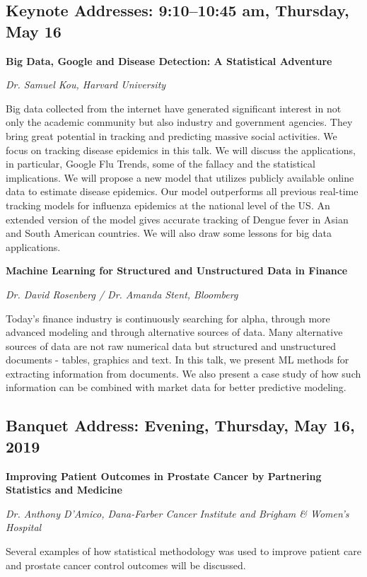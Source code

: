 \documentclass[10pt]{article}
\begin{document}
\subsection*{Keynote Addresses: 9:10--10:45 am, Thursday, May 16}

\noindent
{\bf Big Data, Google and Disease Detection: A Statistical Adventure}

\emph{Dr. Samuel Kou, Harvard University}


Big data collected from the internet have generated significant
interest in not only the academic community but also industry and
government agencies. They bring great potential in tracking and
predicting massive social activities. We focus on tracking disease
epidemics in this talk. We will discuss the applications, in
particular, Google Flu Trends, some of the fallacy and the statistical
implications. We will propose a new model that utilizes publicly
available online data to estimate disease epidemics. Our model
outperforms all previous real-time tracking models for influenza
epidemics at the national level of the US. An extended version of the
model gives accurate tracking of Dengue fever in Asian and South
American countries. We will also draw some lessons for big data
applications.

{\bf Machine Learning for Structured and Unstructured Data in Finance}

\emph{Dr. David Rosenberg / Dr. Amanda Stent, Bloomberg}

Today's finance industry is continuously searching for alpha, through
more advanced modeling and through alternative sources of data. Many
alternative sources of data are not raw numerical data but structured
and unstructured documents - tables, graphics and text. In this talk,
we present ML methods for extracting information from documents. We
also present a case study of how such information can be combined with
market data for better predictive modeling.


\subsection*{Banquet Address:  Evening, Thursday, May 16, 2019}

\noindent
{\bf Improving Patient Outcomes in Prostate Cancer by Partnering
  Statistics and Medicine}

\emph{Dr. Anthony D'Amico, Dana-Farber Cancer Institute and Brigham \& Women's Hospital}

Several examples of how statistical methodology was used to improve
patient care and prostate cancer control outcomes will be discussed.
\end{document}
